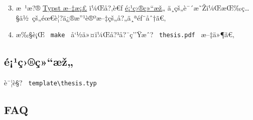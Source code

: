 \begin{Shaded}
\begin{Highlighting}[]
    \KeywordTok{|}   \AttributeTok{{-}{-}} 
 


  \OperatorTok{\textgreater{}} 

\end{Highlighting}
\end{Shaded}

\begin{enumerate}
\setcounter{enumi}{2}
\tightlist
\item
  æ~¹æ?® \href{https://typst.app/docs/}{Typst æ--‡æ¡£} ï¼Œå?‚è€ƒ
  \href{https://github.com/typst/packages/raw/main/packages/preview/modern-sysu-thesis/0.3.0/\#\%E9\%A1\%B9\%E7\%9B\%AE\%E7\%BB\%93\%E6\%9E\%84}{é¡¹ç›®ç»``æž„}
  ä¸­çš„è¯´æ˜Žï¼ŒæŒ‰ç\ldots§ä½~çš„éœ€è¦?ä¿®æ''¹è®ºæ--‡çš„å?„ä¸ªéƒ¨åˆ†ã€‚
\item
  æ‰§è¡Œ \texttt{\ make\ } å`½ä»¤ï¼Œå?³å?¯ç''Ÿæˆ?
  \texttt{\ thesis.pdf\ } æ--‡ä»¶ã€‚
\end{enumerate}

\subsection{é¡¹ç›®ç»``æž„}\label{uxe9uxb9uxe7uxe7uxe6ux17e}

è¯¦è§? \texttt{\ template\textbackslash{}thesis.typ\ }

\subsection{FAQ}\label{faq}

